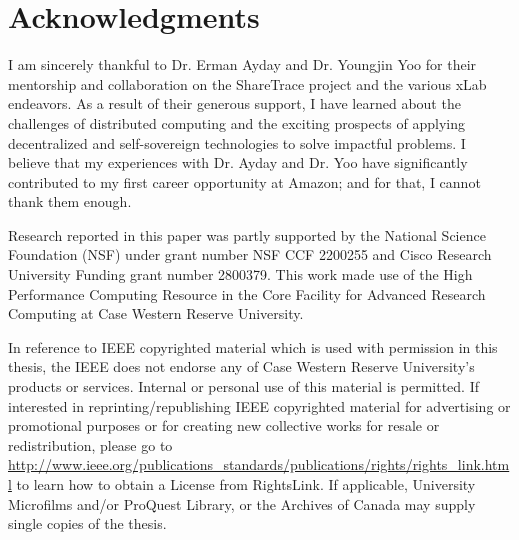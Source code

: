 \section*{Acknowledgments}
I am sincerely thankful to Dr. Erman Ayday and Dr. Youngjin Yoo for their mentorship and collaboration on the ShareTrace project and the various xLab endeavors. As a result of their generous support, I have learned about the challenges of distributed computing and the exciting prospects of applying decentralized and self-sovereign technologies to solve impactful problems. I believe that my experiences with Dr. Ayday and Dr. Yoo have significantly contributed to my first career opportunity at Amazon; and for that, I cannot thank them enough.

Research reported in this paper was partly supported by the National Science Foundation (NSF) under grant number NSF CCF 2200255 and Cisco Research University Funding grant number 2800379. This work made use of the High Performance Computing Resource in the Core Facility for Advanced Research Computing at Case Western Reserve University.

In reference to IEEE copyrighted material which is used with permission in this thesis, the IEEE does not endorse any of Case Western Reserve University’s products or services. Internal or personal use of this material is permitted. If interested in reprinting/republishing IEEE copyrighted material for advertising or promotional purposes or for creating new collective works for resale or redistribution, please go to \url{http://www.ieee.org/publications_standards/publications/rights/rights_link.html} to learn how to obtain a License from RightsLink. If applicable, University Microfilms and/or ProQuest Library, or the Archives of Canada may supply single copies of the thesis.
\clearpage